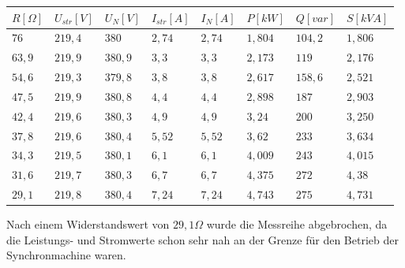 \documentclass{report}
\begin{document}
\begin{table}[!ht]
	\centering
	\begin{tabular}{llllllll}
		\hline
		$R [\Omega]$ & $U_{str} [V]$ & $U_{N} [V]$ & $I_{str} [A]$ & $I_{N} [A]$ & $P [kW]$ & $Q [var]$ & $S [kVA]$ \\ \hline
		$76$         & $219,4$       & $380$       & $2,74$        & $2,74$      & $1,804$  & $104,2$   & $1,806$   \\
		$63,9$       & $219,9$       & $380,9$     & $3,3$         & $3,3$       & $2,173$  & $119$     & $2,176$   \\
		$54,6$       & $219,3$       & $379,8$     & $3,8$         & $3,8$       & $2,617$  & $158,6$   & $2,521$   \\
		$47,5$       & $219,9$       & $380,8$     & $4,4$         & $4,4$       & $2,898$  & $187$     & $2,903$   \\
		$42,4$       & $219,6$       & $380,3$     & $4,9$         & $4,9$       & $3,24$   & $200$     & $3,250$   \\
		$37,8$       & $219,6$       & $380,4$     & $5,52$        & $5,52$      & $3,62$   & $233$     & $3,634$   \\
		$34,3$       & $219,5$       & $380,1$     & $6,1$         & $6,1$       & $4,009$  & $243$     & $4,015$   \\
		$31,6$       & $219,7$       & $380,3$     & $6,7$         & $6,7$       & $4,375$  & $272$     & $4,38$    \\
		$29,1$       & $219,8$       & $380,4$     & $7,24$        & $7,24$      & $4,743$  & $275$     & $4,731$   \\ \hline
	\end{tabular}
	\label{tab:ohm_messreihe_1}
\end{table}

Nach einem Widerstandswert von $29,1\Omega$ wurde die Messreihe abgebrochen, da die Leistungs- und Stromwerte schon sehr nah an der Grenze für den Betrieb der Synchronmachine waren.
\end{document}
